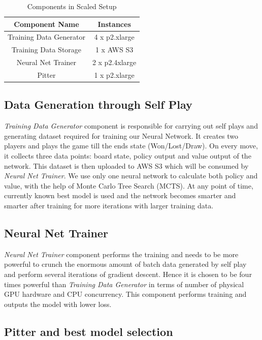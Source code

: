 \documentclass[11pt]{article}
\begin{document}
\begin{table}[h]
\begin{center}
\begin{tabular}{c c}
\hline \bf Component Name & \bf Instances \\ \hline
Training Data Generator & 4 x p2.xlarge \\
Training Data Storage & 1 x AWS S3 \\
Neural Net Trainer & 2 x p2.4xlarge \\
Pitter & 1 x p2.xlarge \\
\hline
\end{tabular}
\end{center}
\caption{\label{font-table} Components in Scaled Setup}
\end{table}


\subsection{Data Generation through Self Play}

{\em Training Data Generator} component is responsible for carrying out self plays and generating dataset required for training our Neural Network. It creates two players and plays the game till the ends state (Won/Lost/Draw). On every move, it collects three data points: board state, policy output and value output of the network. This dataset is then uploaded to AWS S3 which will be consumed by {\em Neural Net Trainer}. We use only one neural network to calculate both policy and value, with the help of Monte Carlo Tree Search (MCTS). At any point of time, currently known best model is used and the network becomes smarter and smarter after training for more iterations with larger training data.


\subsection{Neural Net Trainer}

{\em Neural Net Trainer} component performs the training and needs to be more powerful to crunch the enormous amount of batch data generated by self play and perform several iterations of gradient descent. Hence it is chosen to be four times powerful than {\em Training Data Generator} in terms of number of physical GPU hardware and CPU concurrency. This component performs training and outputs the model with lower loss. 

  
\subsection{Pitter and best model selection}
\end{document}
